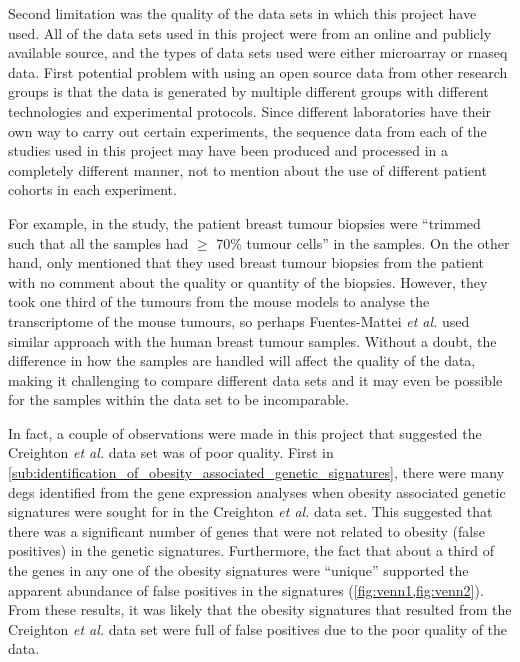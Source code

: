 Second limitation was the quality of the data sets in which this project have used.
All of the data sets used in this project were from an online and publicly available source, and the types of data sets used were either microarray or \gls{rnaseq} data.
First potential problem with using an open source data from other research groups is that the data is generated by multiple different groups with different technologies and experimental protocols.
Since different laboratories have their own way to carry out certain experiments, the sequence data from each of the studies used in this project may have been produced and processed in a completely different manner, not to mention about the use of different patient cohorts in each experiment.

For example, in the \citet{Creighton2012} study, the patient breast tumour biopsies were ``trimmed such that all the samples had $\geq$ 70\% tumour cells'' in the samples.
On the other hand, \citet{Fuentes-Mattei2014} only mentioned that they used breast tumour biopsies from the patient with no comment about the quality or quantity of the biopsies.
However, they took one third of the tumours from the mouse models to analyse the transcriptome of the mouse tumours, so perhaps Fuentes-Mattei \textit{et al.} used similar approach with the human breast tumour samples.
Without a doubt, the difference in how the samples are handled will affect the quality of the data, making it challenging to compare different data sets and it may even be possible for the samples within the data set to be incomparable.

In fact, a couple of observations were made in this project that suggested the Creighton \textit{et al.} data set was of poor quality.
First in \cref{sub:identification_of_obesity_associated_genetic_signatures}, there were many \glspl{deg} identified from the gene expression analyses when obesity associated genetic signatures were sought for in the Creighton \textit{et al.} data set.
This suggested that there was a significant number of genes that were not related to obesity (false positives) in the genetic signatures.
Furthermore, the fact that about a third of the genes in any one of the obesity signatures were ``unique'' supported the apparent abundance of false positives in the signatures (\cref{fig:venn1,fig:venn2}).
From these results, it was likely that the obesity signatures that resulted from the Creighton \textit{et al.} data set were full of false positives due to the poor quality of the data.

